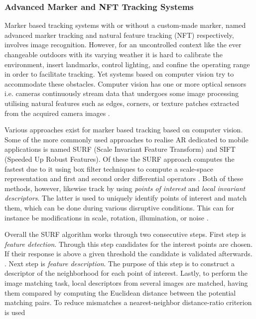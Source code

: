\subsubsection{Advanced Marker and NFT Tracking Systems}
Marker based tracking systems with or without a custom-made marker, named advanced marker tracking and natural feature tracking (NFT) respectively, involves image recognition. However, for an uncontrolled context like the ever changeable outdoors with its varying weather it is hard to calibrate the environment, insert landmarks, control lighting, and confine the operating range in order to facilitate tracking. Yet systems based on computer vision try to accommodate these obstacles. Computer vision has one or more optical sensors i.e. cameras continuously stream data that undergoes some image processing utilising natural features such as edges, corners, or texture patches extracted from the acquired camera images \cite{Barandiaram2010} \cite{Maidi2011}. 

Various approaches exist for marker based tracking based on computer vision. Some of the more commonly used approaches to realise AR dedicated to mobile applications is named SURF (Scale Invariant Feature Transform) and SIFT (Speeded Up Robust Features). Of these the SURF approach computes the fastest due to it using box filter techniques to compute a scale-space representation and first and second order differential operators \cite{Oyallon et al.}. Both of these methods, however, likewise track by using \textit{points of interest} and \textit{local invariant descriptors}. The latter is used to uniquely identify points of interest and match them, which can be done during various disruptive conditions. This can for instance be modifications in scale, rotation, illumination, or noise \cite{Maidi et al.}.

Overall  the SURF algorithm works through two consecutive steps. First step is \textit{feature detection}. Through this step candidates for the interest points are chosen. If their response is above a given threshold the candidate is validated afterwards. \cite{Oyallon et al.}. Next step is \textit{feature description}. The purpose of this step is to construct a descriptor of the neighborhood for each point of interest. \cite{Oyallon et al.} Lastly, to perform the image matching task, local descriptors from several images are matched, having them compared by computing the Euclidean distance between the potential matching pairs. To reduce mismatches a nearest-neighbor distance-ratio criterion is used \cite{Oyallon et al.} 


